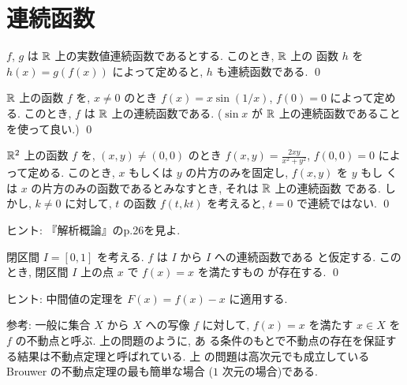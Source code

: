 \documentclass[12pt,twoside]{jarticle}
\begin{document}
\section{連続函数}

\begin{question}
  $f$, $g$ は ${\mathbb R}$ 上の実数値連続函数であるとする. このとき, ${\mathbb R}$ 上の
  函数 $h$ を $h(x)=g(f(x))$ によって定めると, $h$ も連続函数である.
  \qed
\end{question}

\begin{question}
  ${\mathbb R}$ 上の函数 $f$ を, $x\ne0$ のとき $f(x) = x \sin(1/x)$, 
  $f(0) = 0$ によって定める. このとき, $f$ は ${\mathbb R}$ 上の連続函数である. 
  ($\sin x$ が ${\mathbb R}$ 上の連続函数であることを使って良い.) 
  \qed
\end{question}

\begin{question}
  ${\mathbb R}^2$ 上の函数 $f$ を, 
  $(x,y)\ne(0,0)$ のとき $\displaystyle f(x,y)=\frac{2xy}{x^2+y^2}$, 
  $f(0,0) = 0$ によって定める. 
  このとき, $x$ もしくは $y$ の片方のみを固定し, $f(x,y)$ を $y$ もし
  くは $x$ の片方のみの函数であるとみなすとき, それは ${\mathbb R}$ 上の連続函数
  である. しかし, $k\ne0$ に対して, $t$ の函数 $f(t,kt)$ を考えると, 
  $t=0$ で連続ではない. 
  \qed
\end{question}

\noindent ヒント: 『解析概論』のp.26を見よ.

\begin{question}
  閉区間 $I = [0,1]$ を考える. $f$ は $I$ から $I$ への連続函数である
  と仮定する. このとき, 閉区間 $I$ 上の点 $x$ で $f(x)=x$ を満たすもの
  が存在する.
  \qed
\end{question}

\noindent ヒント: 中間値の定理を $F(x) = f(x) - x$ に適用する.

\noindent 参考: 一般に集合 $X$ から $X$ への写像 $f$ に対して,
$f(x)=x$ を満たす $x\in X$ を $f$ の不動点と呼ぶ. 上の問題のように, あ
る条件のもとで不動点の存在を保証する結果は不動点定理と呼ばれている. 上
の問題は高次元でも成立している Brouwer の不動点定理の最も簡単な場合
($1$ 次元の場合)である.


\end{document}
